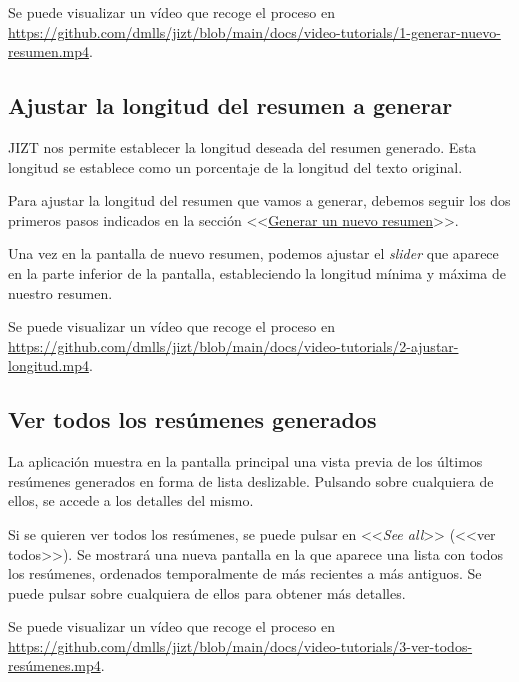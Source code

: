 Se puede visualizar un vídeo que recoge el proceso en \href{https://github.com/dmlls/jizt/blob/main/docs/video-tutorials/1-generar-nuevo-resumen.mp4}{https://github.com/\newline dmlls/jizt/blob/main/docs/video-tutorials/1-generar-nuevo-resumen.mp4}.

\subsection{Ajustar la longitud del resumen a generar}

JIZT nos permite establecer la longitud deseada del resumen generado. Esta longitud se establece como un porcentaje de la longitud del texto original.

Para ajustar la longitud del resumen que vamos a generar, debemos seguir los dos primeros pasos indicados en la sección <<\hyperref[subsection:nuevo-resumen]{Generar un nuevo resumen}>>.

Una vez en la pantalla de nuevo resumen, podemos ajustar el \emph{slider} que aparece en la parte inferior de la pantalla, estableciendo la longitud mínima y máxima de nuestro resumen.

Se puede visualizar un vídeo que recoge el proceso en \href{https://github.com/dmlls/jizt/blob/main/docs/video-tutorials/2-ajustar-longitud.mp4}{https://github.com/\newline dmlls/jizt/blob/main/docs/video-tutorials/2-ajustar-longitud.mp4}.

\subsection{Ver todos los resúmenes generados}

La aplicación muestra en la pantalla principal una vista previa de los últimos resúmenes generados en forma de lista deslizable. Pulsando sobre cualquiera de ellos, se accede a los detalles del mismo.

Si se quieren ver todos los resúmenes, se puede pulsar en <<\emph{See all}>> (<<ver todos>>). Se mostrará una nueva pantalla en la que aparece una lista con todos los resúmenes, ordenados temporalmente de más recientes a más antiguos. Se puede pulsar sobre cualquiera de ellos para obtener más detalles.

Se puede visualizar un vídeo que recoge el proceso en \href{https://github.com/dmlls/jizt/blob/main/docs/video-tutorials/3-ver-todos-resúmenes.mp4}{https://github.com/\newline dmlls/jizt/blob/main/docs/video-tutorials/3-ver-todos-resúmenes.mp4}.

